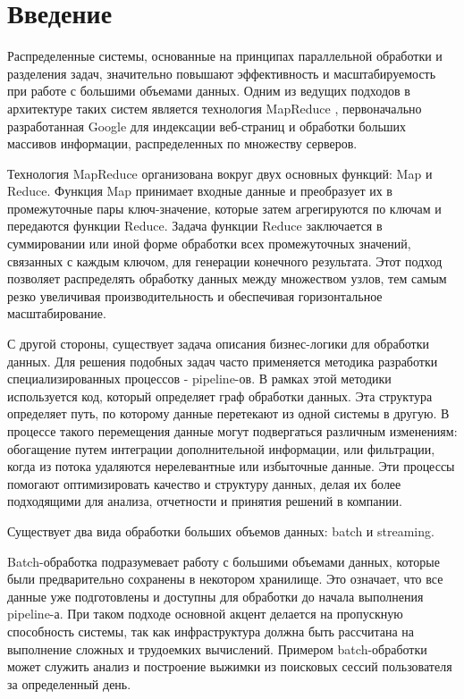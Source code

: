 \section{Введение}
\label{sec:intro}

Распределенные системы, основанные на принципах параллельной обработки и разделения задач, значительно повышают эффективность и масштабируемость при работе с большими объемами данных. Одним из ведущих подходов в архитектуре таких систем является технология MapReduce \cite{mapreduce}, первоначально разработанная Google для индексации веб-страниц и обработки больших массивов информации, распределенных по множеству серверов.

Технология MapReduce организована вокруг двух основных функций: Map и Reduce. Функция Map принимает входные данные и преобразует их в промежуточные пары ключ-значение, которые затем агрегируются по ключам и передаются функции Reduce. Задача функции Reduce заключается в суммировании или иной форме обработки всех промежуточных значений, связанных с каждым ключом, для генерации конечного результата. Этот подход позволяет распределять обработку данных между множеством узлов, тем самым резко увеличивая производительность и обеспечивая горизонтальное масштабирование.

С другой стороны, существует задача описания бизнес-логики для обработки данных. Для решения подобных задач часто применяется методика разработки специализированных процессов - pipeline-ов. В рамках этой методики используется код, который определяет граф обработки данных. Эта структура определяет путь, по которому данные перетекают из одной системы в другую. В процессе такого перемещения данные могут подвергаться различным изменениям: обогащение путем интеграции дополнительной информации, или фильтрации, когда из потока удаляются нерелевантные или избыточные данные. Эти процессы помогают оптимизировать качество и структуру данных, делая их более подходящими для анализа, отчетности и принятия решений в компании.

Существует два вида обработки больших объемов данных: batch и streaming.

Batch-обработка подразумевает работу с большими объемами данных, которые были предварительно сохранены в некотором хранилище. Это означает, что все данные уже подготовлены и доступны для обработки до начала выполнения pipeline-а. При таком подходе основной акцент делается на пропускную способность системы, так как инфраструктура должна быть рассчитана на выполнение сложных и трудоемких вычислений. Примером batch-обработки может служить анализ и построение выжимки из поисковых сессий пользователя за определенный день.

